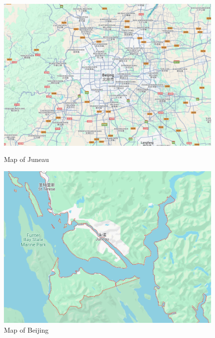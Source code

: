 \documentclass[UTF8]{mcmthesis}
\begin{document}
                \begin{figure}[htbp]
                    \centering
                    \begin{minipage}{0.45\textwidth}
                        \centering
                        \includegraphics[width=\textwidth]{map1.png}
                        \caption{Map of Juneau}
                    \end{minipage}\hfill
                    \begin{minipage}{0.45\textwidth}
                        \centering
                        \includegraphics[width=\textwidth]{map2.png}
                        \caption{Map of Beijing}
                    \end{minipage}
                \end{figure}
                
\end{document}
